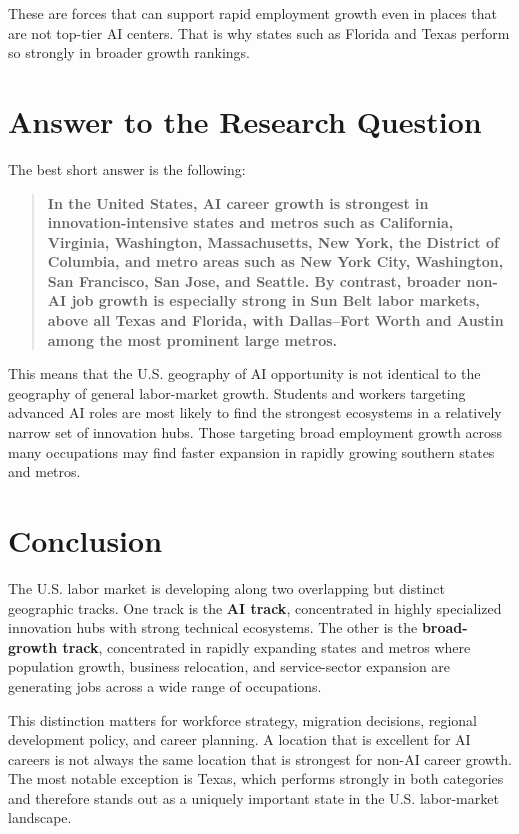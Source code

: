 \documentclass[12pt,a4paper]{article}
\begin{document}
These are forces that can support rapid employment growth even in places that are not top-tier AI centers. That is why states such as Florida and Texas perform so strongly in broader growth rankings.

\section{Answer to the Research Question}

The best short answer is the following:

\begin{quote}
\textbf{In the United States, AI career growth is strongest in innovation-intensive states and metros such as California, Virginia, Washington, Massachusetts, New York, the District of Columbia, and metro areas such as New York City, Washington, San Francisco, San Jose, and Seattle. By contrast, broader non-AI job growth is especially strong in Sun Belt labor markets, above all Texas and Florida, with Dallas--Fort Worth and Austin among the most prominent large metros.}
\end{quote}

This means that the U.S. geography of AI opportunity is not identical to the geography of general labor-market growth. Students and workers targeting advanced AI roles are most likely to find the strongest ecosystems in a relatively narrow set of innovation hubs. Those targeting broad employment growth across many occupations may find faster expansion in rapidly growing southern states and metros.

\section{Conclusion}

The U.S. labor market is developing along two overlapping but distinct geographic tracks. One track is the \textbf{AI track}, concentrated in highly specialized innovation hubs with strong technical ecosystems. The other is the \textbf{broad-growth track}, concentrated in rapidly expanding states and metros where population growth, business relocation, and service-sector expansion are generating jobs across a wide range of occupations.

This distinction matters for workforce strategy, migration decisions, regional development policy, and career planning. A location that is excellent for AI careers is not always the same location that is strongest for non-AI career growth. The most notable exception is Texas, which performs strongly in both categories and therefore stands out as a uniquely important state in the U.S. labor-market landscape.
\end{document}
